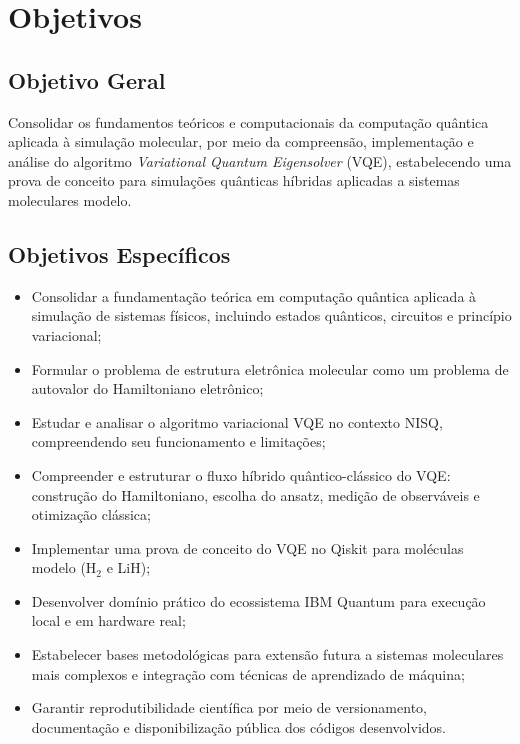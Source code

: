 \section{Objetivos}

\subsection{Objetivo Geral}

Consolidar os fundamentos teóricos e computacionais da computação
quântica aplicada à simulação molecular, por meio da compreensão,
implementação e análise do algoritmo \textit{Variational Quantum
Eigensolver} (VQE), estabelecendo uma prova de conceito para
simulações quânticas híbridas aplicadas a sistemas moleculares
modelo.

\subsection{Objetivos Específicos}

\begin{itemize}
    \item Consolidar a fundamentação teórica em computação quântica aplicada à simulação de sistemas físicos, incluindo estados quânticos, circuitos e princípio variacional;
    
    \item Formular o problema de estrutura eletrônica molecular como um problema de autovalor do Hamiltoniano eletrônico;
    
    \item Estudar e analisar o algoritmo variacional VQE no contexto NISQ, compreendendo seu funcionamento e limitações;
    
    \item Compreender e estruturar o fluxo híbrido quântico-clássico do VQE: construção do Hamiltoniano, escolha do ansatz, medição de observáveis e otimização clássica;
    
    \item Implementar uma prova de conceito do VQE no Qiskit para moléculas modelo (H$_2$ e LiH);
    
    \item Desenvolver domínio prático do ecossistema IBM Quantum para execução local e em hardware real;
    
    \item Estabelecer bases metodológicas para extensão futura a sistemas moleculares mais complexos e integração com técnicas de aprendizado de máquina;
    
    \item Garantir reprodutibilidade científica por meio de versionamento, documentação e disponibilização pública dos códigos desenvolvidos.
\end{itemize}
